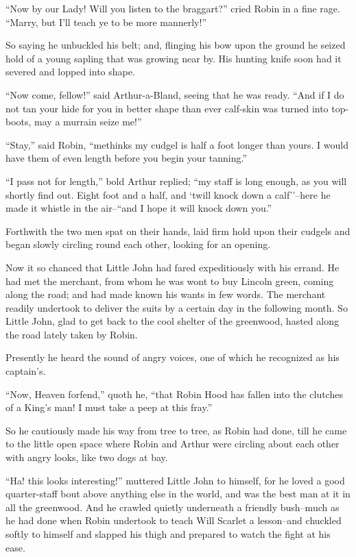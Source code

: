 ``Now by our Lady! Will you listen to the braggart?'' cried Robin in a
fine rage. ``Marry, but I'll teach ye to be more mannerly!''

So saying he unbuckled his belt; and, flinging his bow upon the ground
he seized hold of a young sapling that was growing near by. His hunting
knife soon had it severed and lopped into shape.

``Now come, fellow!'' said Arthur-a-Bland, seeing that he was ready.
``And if I do not tan your hide for you in better shape than ever
calf-skin was turned into top-boots, may a murrain seize me!''

``Stay,'' said Robin, ``methinks my cudgel is half a foot longer than
yours. I would have them of even length before you begin your tanning.''

``I pass not for length,'' bold Arthur replied; ``my staff is long
enough, as you will shortly find out. Eight foot and a half, and `twill
knock down a calf''--here he made it whistle in the air--``and I hope it
will knock down you.''

Forthwith the two men spat on their hands, laid firm hold upon their
cudgels and began slowly circling round each other, looking for an
opening.

Now it so chanced that Little John had fared expeditiously with his
errand. He had met the merchant, from whom he was wont to buy Lincoln
green, coming along the road; and had made known his wants in few words.
The merchant readily undertook to deliver the suits by a certain day in
the following month. So Little John, glad to get back to the cool
shelter of the greenwood, hasted along the road lately taken by Robin.

Presently he heard the sound of angry voices, one of which he recognized
as his captain's.

``Now, Heaven forfend,'' quoth he, ``that Robin Hood has fallen into the
clutches of a King's man! I must take a peep at this fray.''

So he cautiously made his way from tree to tree, as Robin had done, till
he came to the little open space where Robin and Arthur were circling
about each other with angry looks, like two dogs at bay.

``Ha! this looks interesting!'' muttered Little John to himself, for he
loved a good quarter-staff bout above anything else in the world, and
was the best man at it in all the greenwood. And he crawled quietly
underneath a friendly bush--much as he had done when Robin undertook to
teach Will Scarlet a lesson--and chuckled softly to himself and slapped
his thigh and prepared to watch the fight at his ease.

